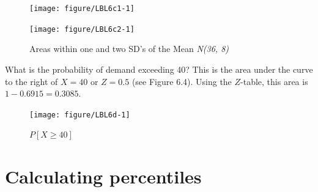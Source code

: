 \documentclass[11pt, chapterprefix=true]{scrbook}\usepackage[]{graphicx}\usepackage[]{color}
\begin{document}
\begin{figure}[ht]

\caption{Areas within one and two SD's of the Mean \textit{N(36, 8)}}

\begin{minipage}[ht]{7cm}



{\centering \texttt{[image: figure/LBL6c1-1]} 

}



\end{minipage}
\begin{minipage}[ht]{7cm}


{\centering \texttt{[image: figure/LBL6c2-1]} 

}



\end{minipage}
\end{figure}

What is the probability of demand exceeding 40?  This is the area under the curve to the right of $X = 40$ or $Z = 0.5$ (see Figure 6.4).  Using the $Z$-table, this area is $1 -  0.6915 = 0.3085$.

\begin{figure}[ht]

\caption{$P[ X \ge 40 ]$ }





{\centering \texttt{[image: figure/LBL6d-1]} 

}




\end{figure}

\section{Calculating percentiles}     %
\end{document}
